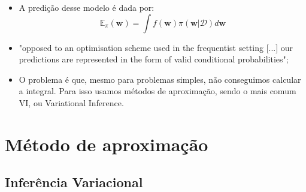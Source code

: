 \documentclass{beamer}
\begin{document}
\begin{frame}
    \frametitle{}

    \begin{itemize}
        \item A predição desse modelo é dada por:
        $$ \mathbb{E}_\pi (\mathbf{w}) = \int f(\mathbf{w})\pi(\mathbf{w}|\mathcal{D}) d\mathbf{w} $$
        \item "opposed to an optimisation scheme used in the frequentist setting [...] our predictions are represented in the form of valid conditional probabilities";
        \item O problema é que, mesmo para problemas simples, não conseguimos calcular a integral. Para isso usamos métodos de aproximação, sendo o mais comum VI, ou Variational Inference.
    \end{itemize}
\end{frame}

\section{Método de aproximação}

\subsection{Inferência Variacional}

\end{document}
